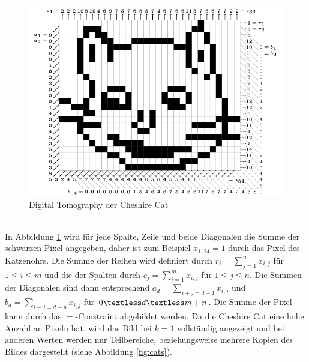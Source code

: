 \documentclass[a4,abstract=on]{scrartcl}
\begin{document}
\begin{figure}[H]
\centering
\includegraphics[width=\textwidth]{cheshire.png}
\caption{Digital Tomography der Cheshire Cat \cite[aus][Seite 25]{knuth}}
\label{fig:cheshire}
\end{figure}
\ \\
In Abbildung \ref{fig:cheshire} wird für jede Spalte, Zeile und beide Diagonalen die Summe der schwarzen Pixel angegeben, daher ist zum Beispiel $x_{1,24}=1$ durch das Pixel des Katzenohrs. Die Summe der Reihen wird definiert durch $r_i=\sum_{j=1}^{n} x_{i,j}$ für $1 \leq i \leq m$ und die der Spalten durch $c_j=\sum_{i=1}^{m} x_{i,j}$ für $1 \leq j \leq n$. Die Summen der Diagonalen sind dann entsprechend $a_d=\sum_{i+j=d+1} x_{i,j}$ und $b_d=\sum_{i-j=d-n} x_{i,j}$ für $0 \textless d \textless m+n$. Die Summe der Pixel kann durch das $=$-Constraint abgebildet werden. Da die Cheshire Cat eine hohe Anzahl an Pixeln hat, wird das Bild bei $k=1$ vollständig angezeigt und bei anderen Werten werden nur Teilbereiche, beziehungsweise mehrere Kopien des Bildes dargestellt (siehe Abbildung \ref{fig:cats}).
\end{document}
